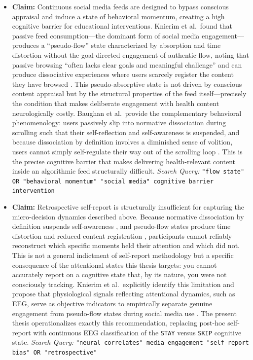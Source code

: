\documentclass[12pt,a4paper]{report}
\begin{document}
\begin{itemize}
    \item \textbf{Claim:} Continuous social media feeds are designed to bypass conscious appraisal and induce a state of behavioral momentum, creating a high cognitive barrier for educational interventions. Knierim et al.\ found that passive feed consumption---the dominant form of social media engagement---produces a ``pseudo-flow'' state characterized by absorption and time distortion without the goal-directed engagement of authentic flow, noting that passive browsing ``often lacks clear goals and meaningful challenge'' and can produce dissociative experiences where users scarcely register the content they have browsed \cite{knierim_flow_2026}. This pseudo-absorptive state is not driven by conscious content appraisal but by the structural properties of the feed itself---precisely the condition that makes deliberate engagement with health content neurologically costly. Baughan et al.\ provide the complementary behavioral phenomenology: users passively slip into normative dissociation during scrolling such that their self-reflection and self-awareness is suspended, and because dissociation by definition involves a diminished sense of volition, users cannot simply self-regulate their way out of the scrolling loop \cite{baughan_i_2022}. This is the precise cognitive barrier that makes delivering health-relevant content inside an algorithmic feed structurally difficult.
    \textit{Search Query:} \texttt{"flow state" OR "behavioral momentum" "social media" cognitive barrier intervention}
    
    \item \textbf{Claim:} Retrospective self-report is structurally insufficient for capturing the micro-decision dynamics described above. Because normative dissociation by definition suspends self-awareness \cite{baughan_i_2022}, and pseudo-flow states produce time distortion and reduced content registration \cite{knierim_flow_2026}, participants cannot reliably reconstruct which specific moments held their attention and which did not. This is not a general indictment of self-report methodology but a specific consequence of the attentional states this thesis targets: you cannot accurately report on a cognitive state that, by its nature, you were not consciously tracking. Knierim et al.\ explicitly identify this limitation and propose that physiological signals reflecting attentional dynamics, such as EEG, serve as objective indicators to empirically separate genuine engagement from pseudo-flow states during social media use \cite{knierim_flow_2026}. The present thesis operationalizes exactly this recommendation, replacing post-hoc self-report with continuous EEG classification of the \texttt{STAY} versus \texttt{SKIP} cognitive state.
    \textit{Search Query:} \texttt{"neural correlates" media engagement "self-report bias" OR "retrospective"}
\end{itemize}
\end{document}
